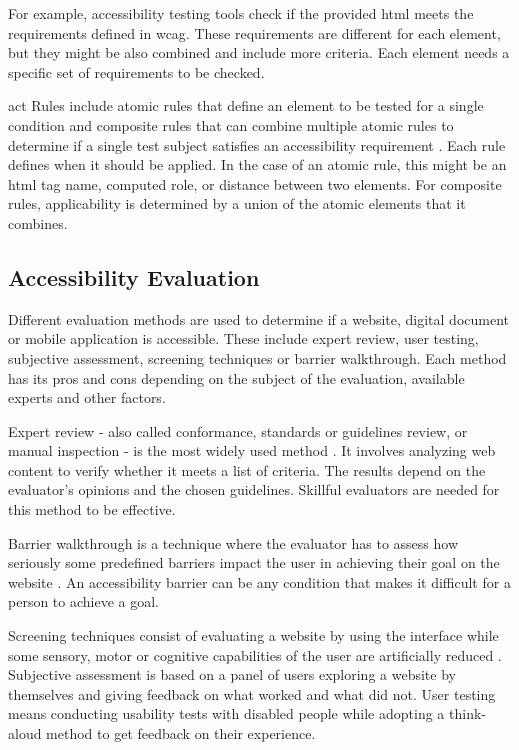 \documentclass{master_thesis}
\begin{document}
For example, accessibility testing tools check if the provided \ac{html} meets the requirements defined in \ac{wcag}. These requirements are different for each element, but they might be also combined and include more criteria. Each element needs a specific set of requirements to be checked.

\ac{act} Rules include atomic rules that define an element to be tested for a single condition and composite rules that can combine multiple atomic rules to determine if a single test subject satisfies an accessibility requirement \citep{Fiers2019}. Each rule defines when it should be applied. In the case of an atomic rule, this might be an \ac{html} tag name, computed role, or distance between two elements. For composite rules, applicability is determined by a union of the atomic elements that it combines.

\subsection{Accessibility Evaluation}

Different evaluation methods are used to determine if a website, digital document or mobile application is accessible. These include expert review, user testing, subjective assessment, screening techniques or barrier walkthrough. Each method has its pros and cons depending on the subject of the evaluation, available experts and other factors.

Expert review - also called conformance, standards or guidelines review, or manual inspection - is the most widely used method \citep{Brajnik2008}. It involves analyzing web content to verify whether it meets a list of criteria. The results depend on the evaluator's opinions and the chosen guidelines. Skillful evaluators are needed for this method to be effective.

Barrier walkthrough is a technique where the evaluator has to assess how seriously some predefined barriers impact the user in achieving their goal on the website \citep{Brajnik2008}. An accessibility barrier can be any condition that makes it difficult for a person to achieve a goal.

Screening techniques consist of evaluating a website by using the interface while some sensory, motor or cognitive capabilities of the user are artificially reduced \citep{Brajnik2008}. Subjective assessment is based on a panel of users exploring a website by themselves and giving feedback on what worked and what did not. User testing means conducting usability tests with disabled people while adopting a think-aloud method to get feedback on their experience.
\end{document}
